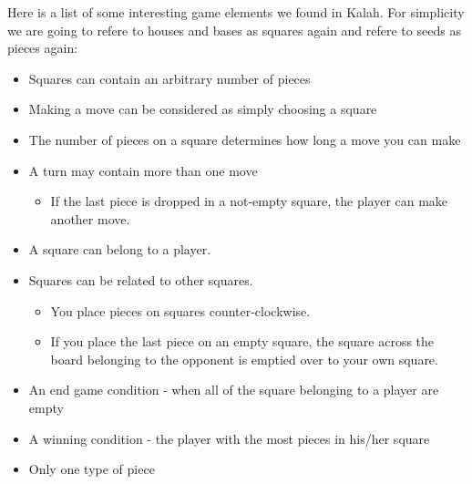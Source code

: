 Here is a list of some interesting game elements we found in Kalah. For simplicity we are going to refere to houses and bases as squares again and refere to seeds as pieces again:
\begin{itemize}[noitemsep]
\item Squares can contain an arbitrary number of pieces
\item Making a move can be considered as simply choosing a square
\item The number of pieces on a square determines how long a move you can make
\item A turn may contain more than one move
	\begin{itemize}[noitemsep]
	\item If the last piece is dropped in a not-empty square, the player can make another move.
	\end{itemize}
\item A square can belong to a player.
\item Squares can be related to other squares.
	\begin{itemize}[noitemsep]
	\item You place pieces on squares counter-clockwise.
	\item If you place the last piece on an empty square, the square across the board belonging to the opponent is emptied over to your own square.
	\end{itemize}
\item An end game condition - when all of the square belonging to a player are empty
\item A winning condition - the player with the most pieces in his/her square
\item Only one type of piece
\end{itemize}
